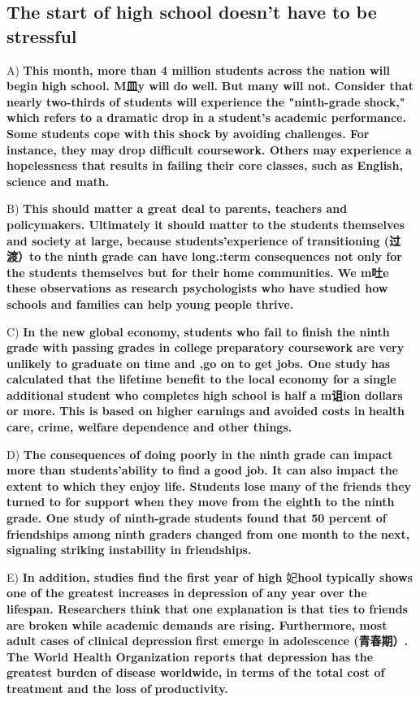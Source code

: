 \documentclass[UTF8,11pt]{ctexart}
\begin{document}
\subsection*{\textbf{The start of high school doesn't have to be stressful}}


A) \textbf{This month, more than 4 million students across the nation will begin high school. M皿y will do well.} \textbf{But many will not. Consider that nearly two-thirds of students will experience the "ninth-grade} \textbf{shock," which refers to a dramatic drop in a student's academic performance. Some students cope with} \textbf{this shock by avoiding challenges. For instance, they may drop difficult coursework. Others may} \textbf{experience a hopelessness that results in failing their core classes, such as English, science and math.}


B) \textbf{This should matter a great deal to parents, teachers and policymakers. Ultimately it should matter to} \textbf{the students themselves and society at large, because students'experience of transitioning (过渡）to} \textbf{the ninth grade can have long.:term consequences not only for the students themselves but for their} \textbf{home communities. We m吐e these observations as research psychologists who have studied how} \textbf{schools and families can help young people thrive.}


C) \textbf{In the new global economy, students who fail to finish the ninth grade with passing grades in college} \textbf{preparatory coursework are very unlikely to graduate on time and ,go on to get jobs. One study has} \textbf{calculated that the lifetime benefit to the local economy for a single additional student who completes} \textbf{high school is half a m诅ion dollars or more. This is based on higher earnings and avoided costs in} \textbf{health care, crime, welfare dependence and other things.}


D) \textbf{The consequences of doing poorly in the ninth grade can impact more than students'ability to find a} \textbf{good job. It can also impact the extent to which they enjoy life. Students lose many of the friends they} \textbf{turned to for support when they move from the eighth to the ninth grade. One study of ninth-grade} \textbf{students found that 50 percent of friendships among ninth graders changed from one month to the} \textbf{next, signaling striking instability in friendships.}


E) \textbf{In addition, studies find the first year of high} 妃\textbf{hool typically shows one of the greatest increases in} \textbf{depression of any year over the lifespan. Researchers think that one explanation is that ties to friends} \textbf{are broken while academic demands are rising. Furthermore, most adult cases of clinical depression} \textbf{first emerge in adolescence (青春期）. The World Health Organization reports that depression has the} \textbf{greatest burden of disease worldwide, in terms of the total cost of treatment and the loss of} \textbf{productivity.}
\end{document}
